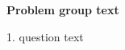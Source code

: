 \documentclass{article}
\begin{document}
\begin{description} %
  \setlength\itemsep{5em}

  \item\textbf{Problem group text}

        \begin{description} %
          \setlength\itemsep{3em}

          \item 1. question text

        \end{description}

\end{description}
\end{document}
